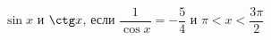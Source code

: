 \begin{ex}[type=calculate]
	\begin{condition}
		\( \sin x \) и \( \ctg x \), \quad если \( \dfrac{1}{\cos x}=-\dfrac{5}{4} \) и \( \pi<x<\dfrac{3\pi}{2} \)
	\end{condition}
\end{ex}